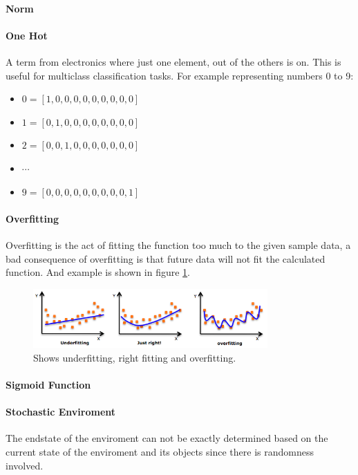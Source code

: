\paragraph{Norm} 

\paragraph{One Hot}
A term from electronics where just one element, out of the others is on. This is useful for multiclass classification tasks. For example representing numbers 0 to 9: 
\begin{itemize}
\item $0 = [1, 0, 0, 0, 0, 0, 0, 0, 0, 0]$
\item $1 = [0, 1, 0, 0, 0, 0, 0, 0, 0, 0]$
\item $2 = [0, 0, 1, 0, 0, 0, 0, 0, 0, 0]$
\item[] $\cdots$
\item $9 = [0, 0, 0, 0, 0, 0, 0, 0, 0, 1]$

\end{itemize}
\paragraph{Overfitting}
Overfitting is the act of fitting the function too much to the given sample data, a bad consequence of overfitting is that future data will not fit the calculated function. And example is shown in figure \ref{fig:svm-overfitting}.

\begin{figure}
\centering
\includegraphics[width=0.8\textwidth]{images/svm-overfitting.png}
\caption{\label{fig:svm-overfitting} Shows underfitting, right fitting and overfitting.}
\end{figure}

\paragraph{Sigmoid Function}

\paragraph{Stochastic Enviroment}
The endstate of the enviroment can not be exactly determined based on the current state of the enviroment and its objects since there is randomness involved.

